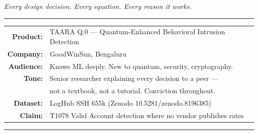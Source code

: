 \documentclass[11pt,a4paper]{article}
\begin{document}
\begin{titlepage}
\centering\vspace*{1.5cm}


\vspace{0.8cm}
{\large\color{taaraGray}\textit{Every design decision. Every equation. Every reason it works.}}

\vspace{0.6cm}\rule{13cm}{0.4pt}\vspace{0.6cm}

{\normalsize
\begin{tabular}{@{}rl@{}}
\textbf{Product:}   & TAARA Q.0 — Quantum-Enhanced Behavioral Intrusion Detection \\[3pt]
\textbf{Company:}   & GoodWinSun, Bengaluru \\[3pt]
\textbf{Audience:}  & Knows ML deeply. New to quantum, security, cryptography. \\[3pt]
\textbf{Tone:}      & Senior researcher explaining every decision to a peer — \\
                    & not a textbook, not a tutorial. Conviction throughout. \\[3pt]
\textbf{Dataset:}   & LogHub SSH 655k (Zenodo 10.5281/zenodo.8196385) \\[3pt]
\textbf{Claim:}     & T1078 Valid Account detection where no vendor publishes rates \\
\end{tabular}
}

\vspace{0.8cm}\rule{13cm}{0.4pt}\vspace{0.6cm}


\end{titlepage}
\end{document}
